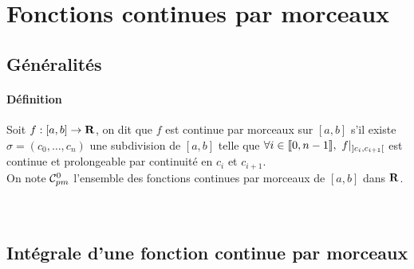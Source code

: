 	\section{Fonctions continues par morceaux}
	\subsection{Généralités}
		\traitd
		\paragraph{Définition}
			Soit $f : [a,b] \rightarrow {\mathbf{R}}$, on dit que $f$ est continue par morceaux sur $[a,b]$ s'il existe $\sigma = (c_0,\dots ,c_n)$ une 
			subdivision de $[a,b]$ telle que $\forall i\in{\llbracket 0,n-1 \rrbracket} ,~f|_{]c_i,c_{i+1}[}$ est continue et prolongeable par continuité en $c_i$ et 
			$c_{i+1}$. \trait \vspace*{-1.1cm} \\
		On note ${\mathcal{C}_{pm}^0}$ l'ensemble des fonctions continues par morceaux de $[a,b]$ dans ${\mathbf{R}}$.
		\vspace*{0.5cm} \\ 
		\vspace*{0.5cm} \\ 
		\vspace*{0.5cm} \\ 
	\subsection{Intégrale d'une fonction continue par morceaux}
		\traitd
